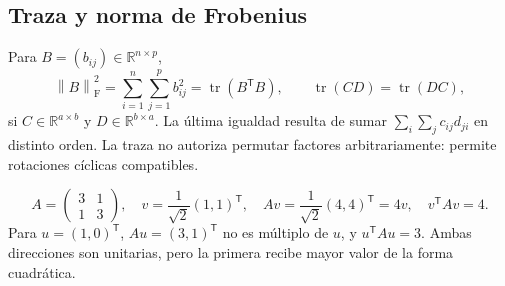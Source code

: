 \documentclass[11pt,a4paper]{article}
\newcommand{\R}{\mathbb R}
\newcommand{\T}{^{\mathsf T}}
\newcommand{\norm}[1]{\left\lVert #1\right\rVert}
\DeclareMathOperator{\tr}{tr}
\newcommand{\F}{_{\mathrm F}}
\theoremstyle{definition}
\begin{document}
\subsection{Traza y norma de Frobenius}
Para $B=(b_{ij})\in\R^{n\times p}$,
\[
\norm B\F^2=\sum_{i=1}^n\sum_{j=1}^pb_{ij}^2=\tr(B\T B),\qquad
\tr(CD)=\tr(DC),
\]
si $C\in\R^{a\times b}$ y $D\in\R^{b\times a}$. La última igualdad resulta de sumar $\sum_i\sum_j c_{ij}d_{ji}$ en distinto orden. La traza no autoriza permutar factores arbitrariamente: permite rotaciones cíclicas compatibles.
\begin{ejemplo}
\[
A=\begin{pmatrix}3&1\\1&3\end{pmatrix},\quad
v=\frac1{\sqrt2}(1,1)\T,\quad
Av=\frac1{\sqrt2}(4,4)\T=4v,\quad v\T Av=4.
\]
Para $u=(1,0)\T$, $Au=(3,1)\T$ no es múltiplo de $u$, y $u\T Au=3$. Ambas direcciones son unitarias, pero la primera recibe mayor valor de la forma cuadrática.
\end{ejemplo}
\end{document}
